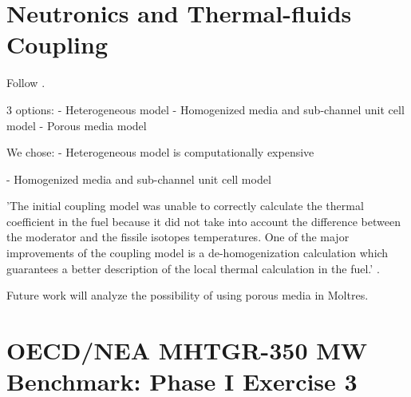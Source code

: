 
\section{Neutronics and Thermal-fluids Coupling}

Follow \cite{j_ortensi_initial_2012}.

3 options:
- Heterogeneous model
- Homogenized media and sub-channel unit cell model
- Porous media model

We chose:
- Heterogeneous model is computationally expensive

- Homogenized media and sub-channel unit cell model

'The initial coupling model was unable to correctly calculate the thermal coefficient in the fuel because it did not take into account the difference between the moderator and the fissile isotopes temperatures.
One of the major improvements of the coupling model is a de-homogenization calculation which guarantees a better description of the local thermal calculation in the fuel.' \cite{damian_vhtr_2008}.

Future work will analyze the possibility of using porous media in Moltres.


\section{OECD/NEA MHTGR-350 MW Benchmark: Phase I Exercise 3}

